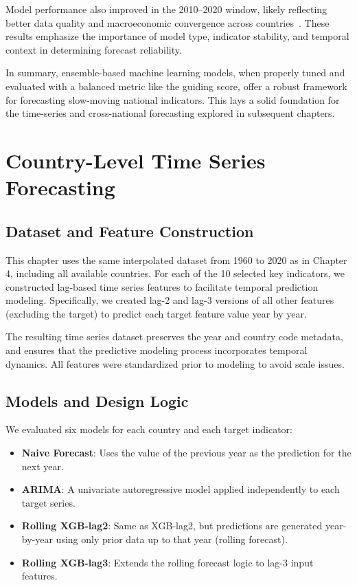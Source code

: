 \documentclass[12pt]{article}
\begin{document}
Model performance also improved in the 2010–2020 window, likely reflecting better data quality and macroeconomic convergence across countries~\cite{Baldwin2016Great, Jerven2013Poor}. These results emphasize the importance of model type, indicator stability, and temporal context in determining forecast reliability.

In summary, ensemble-based machine learning models, when properly tuned and evaluated with a balanced metric like the guiding score, offer a robust framework for forecasting slow-moving national indicators. This lays a solid foundation for the time-series and cross-national forecasting explored in subsequent chapters.


\section{Country-Level Time Series Forecasting}


\subsection{Dataset and Feature Construction}

This chapter uses the same interpolated dataset from 1960 to 2020 as in Chapter 4, including all available countries. For each of the 10 selected key indicators, we constructed lag-based time series features to facilitate temporal prediction modeling. Specifically, we created lag-2 and lag-3 versions of all other features (excluding the target) to predict each target feature value year by year.

The resulting time series dataset preserves the year and country code metadata, and ensures that the predictive modeling process incorporates temporal dynamics. All features were standardized prior to modeling to avoid scale issues.

\subsection{Models and Design Logic}

We evaluated six models for each country and each target indicator:

\begin{itemize}
    \item \textbf{Naive Forecast}: Uses the value of the previous year as the prediction for the next year.
    \item \textbf{ARIMA}: A univariate autoregressive model applied independently to each target series.
    \item \textbf{Rolling XGB-lag2}: Same as XGB-lag2, but predictions are generated year-by-year using only prior data up to that year (rolling forecast).
    \item \textbf{Rolling XGB-lag3}: Extends the rolling forecast logic to lag-3 input features.
\end{itemize}
\end{document}
